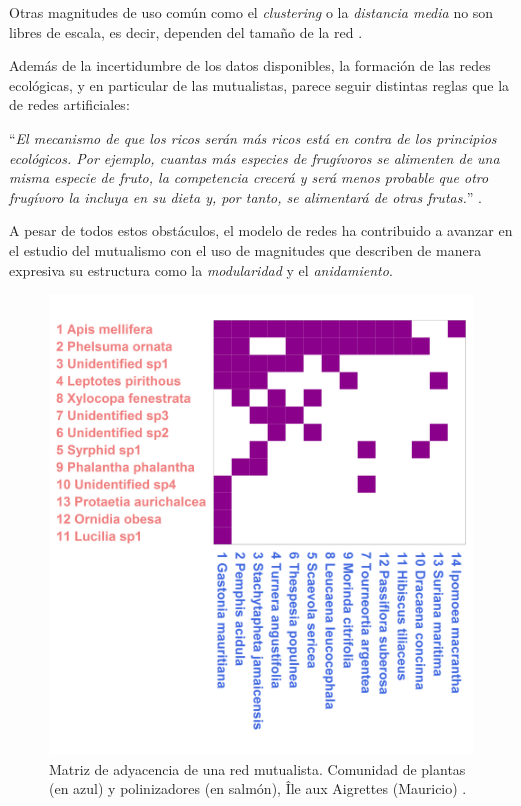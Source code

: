 Otras magnitudes de uso común como el \textit{clustering} o la \textit{distancia media} no son libres de escala, es decir, dependen del tamaño de la red \cite{olesen2006smallest}.

Además de la incertidumbre de los datos disponibles, la formación de las redes ecológicas, y en particular de las mutualistas, parece seguir distintas reglas que la de redes artificiales:

\enquote{\itshape El mecanismo de que los ricos serán más ricos está en contra de los principios ecológicos. Por ejemplo, cuantas más especies de frugívoros se alimenten de una misma especie de fruto, la competencia crecerá y será menos probable que otro frugívoro la incluya en su dieta y, por tanto, se alimentará de otras frutas.} \cite{montoya2006ecological}.

A pesar de todos estos obstáculos, el modelo de redes ha contribuido a avanzar en el estudio del mutualismo con el uso de magnitudes que describen de manera expresiva su estructura como la \textit{modularidad} y el \textit{anidamiento}.
%

\begin{figure}[h!]
\centering
\includegraphics[scale=0.3]{Figures/INTRO_M_PL_011a_matrix.png}
\caption{Matriz de adyacencia de una red mutualista. Comunidad de plantas (en azul) y polinizadores (en salmón), Île aux Aigrettes (Mauricio) \cite{olesen2002invasion}.}
\label{fig:INTRO_M_PL_011a_matrix}
\end{figure}


